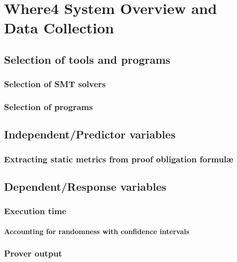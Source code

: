 \chapter{Where4 System Overview and Data Collection}%

\label{Experimental} %



\section{Selection of tools and programs}
\subsection{Selection of \textsc{SMT} solvers}
\subsection{Selection of \why programs}

\section{Independent/Predictor variables}
\subsection{Extracting static metrics from \why proof obligation formul\ae}

\section{Dependent/Response variables}
\subsection{Execution time}
\subsubsection{Accounting for randomness with confidence intervals}
\subsection{Prover output}





